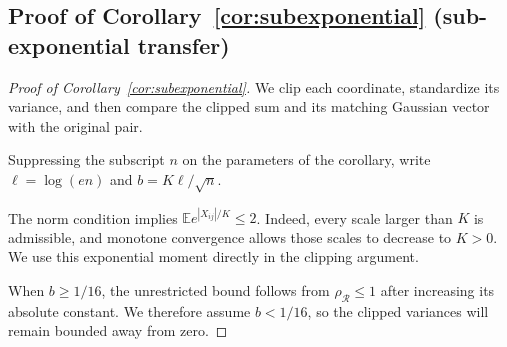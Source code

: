 \documentclass[11pt,letterpaper]{article}
\theoremstyle{remark}
\newcommand{\E}{\mathbb E}
\newcommand{\rh}{\rho_{\mathcal R}}
\begin{document}
\subsection{Proof of Corollary~\ref*{cor:subexponential} (sub-exponential transfer)}\label{app:subexponential}
\begin{proof}[Proof of Corollary~\ref{cor:subexponential}]

We clip each coordinate, standardize its variance, and then compare the
clipped sum and its matching Gaussian vector with the original pair.

Suppressing the subscript \(n\) on the parameters of the corollary,
write \(\ell=\log(en)\) and \(b=K\ell/\sqrt n\).

The norm condition implies \(\E e^{|X_{ij}|/K}\le2\). Indeed,
every scale larger than \(K\) is admissible, and monotone convergence
allows those scales to decrease to \(K>0\). We use this exponential
moment directly in the clipping argument.

When \(b\ge1/16\), the unrestricted bound follows from
\(\rh\le1\) after increasing its absolute constant. We therefore
assume \(b<1/16\), so the clipped variances will remain bounded
away from zero.


\end{proof}
\end{document}
